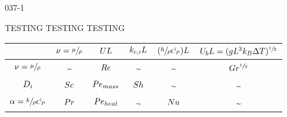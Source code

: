 \begin{mitframe}{037-1}


TESTING TESTING TESTING

\begin{longtable}{ | c | c | c | c | c | c | } 
 \hline
    & $\freq = \sfrac{\chempot}{\dens}$
    & $\uvel\length$ 
    & $\masstranscoeff\length$ 
    & $(\sfrac{\planck}{\dens\hat{\cp}})\length$
    & $\uvel_{b}\length = (\grav\length^{3}\boltz\iipf\Temp)^{\sfrac{1}{2}}$
    \\
    \hline
    $\freq = \sfrac{\chempot}{\dens}$ & \textasciitilde & $\reynolds$ & \textasciitilde & \textasciitilde & $\grashof^{\sfrac{1}{2}}$ \\ \hline
    $\pdiff$ & $\schmidt$ & $\peclet_{mass}$ & $\sherwood$ & \textasciitilde & \textasciitilde \\ \hline    
    $\tdiff = \sfrac{\thermcond}{\dens\hat{\cp}}$ & $\prandtl$ & $\peclet_{heat}$ & \textasciitilde & $\nusselt$ & \textasciitilde \\ \hline   
 \hline 
 
\end{longtable}

\end{mitframe}